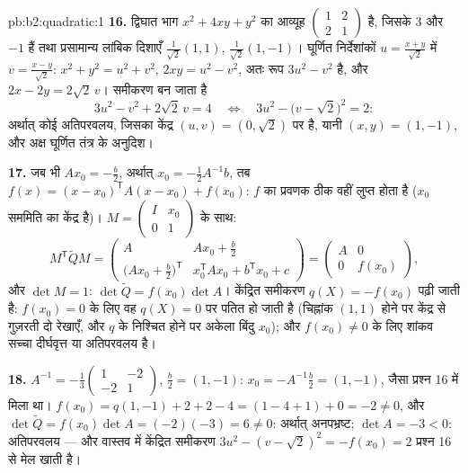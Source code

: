 \begin{solution}{pb:b2:quadratic:1}
\textbf{16.} द्विघात भाग $x^2 + 4xy + y^2$ का आव्यूह $\begin{pmatrix}1 & 2\\ 2 & 1\end{pmatrix}$ है, जिसके  $3$
और $-1$ हैं तथा प्रसामान्य लांबिक दिशाएँ $\frac{1}{\sqrt2}(1,1)$, $\frac{1}{\sqrt2}(1,-1)$। घूर्णित निर्देशांकों
$u =
\frac{x+y}{\sqrt2}$ में $v = \frac{x-y}{\sqrt2}$: $x^2 + y^2 = u^2
+ v^2$, $2xy = u^2 - v^2$, अतः रूप $3u^2 - v^2$ है, और $2x
- 2y = 2\sqrt2\,v$। समीकरण बन जाता है
\[
3u^2 - v^2 + 2\sqrt2\,v = 4
\quad\Longleftrightarrow\quad
3u^2 - \bigl(v - \sqrt2\bigr)^2 = 2 :
\]
अर्थात् कोई अतिपरवलय, जिसका केंद्र $(u, v) = (0, \sqrt2)$ पर है, यानी $(x, y) =
(1, -1)$, और अक्ष घूर्णित
तंत्र के अनुदिश।

\textbf{17.} जब भी $Ax_0 = -\frac b2$, अर्थात् $x_0 = -\frac12A^{-1}b$, तब $f(x) = (x - x_0)^{\mathsf T}A(x - x_0) + f(x_0)$: $f$ का प्रवणक ठीक वहीं लुप्त
होता है ($x_0$ सममिति का केंद्र है)। $M = \begin{pmatrix} I & x_0\\ 0 &
1\end{pmatrix}$ के साथ:
\[
M^{\mathsf T}\widetilde QM
= \begin{pmatrix}
A & Ax_0 + \frac b2\\[2pt]
\bigl(Ax_0 + \frac b2\bigr)^{\mathsf T} &
x_0^{\mathsf T}Ax_0 + b^{\mathsf T}x_0 + c
\end{pmatrix}
= \begin{pmatrix} A & 0\\ 0 & f(x_0)\end{pmatrix},
\]
और $\det M = 1$: $\det\widetilde Q = f(x_0)\det A$। केंद्रित समीकरण $q(X) = -f(x_0)$ पढ़ी जाती है: $f(x_0) = 0$ के लिए वह $q(X) = 0$ पर
पतित हो जाती है (चिह्नांक $(1,1)$ होने पर केंद्र से गुज़रती दो रेखाएँ, और
$q$ के निश्चित होने पर अकेला बिंदु $x_0$); और $f(x_0) \neq 0$ के लिए शांकव सच्चा
दीर्घवृत्त या अतिपरवलय है।

\textbf{18.} $A^{-1} = -\frac13\begin{pmatrix} 1 & -2\\ -2 &
1\end{pmatrix}$, $\frac b2 = (1, -1)$: $x_0 =
-A^{-1}\frac b2 = (1, -1)$, जैसा प्रश्न 16 में मिला था। $f(x_0) =
q(1,-1) + 2 + 2 - 4 = (1 - 4 + 1) + 0 = -2 \neq 0$, और $\det\widetilde Q = f(x_0)\det A = (-2)(-3) = 6 \neq 0$:
अर्थात् अनपभ्रष्ट; $\det A = -3 < 0$: अतिपरवलय --- और वास्तव में केंद्रित समीकरण $3u^2 - (v - \sqrt2)^2 = -f(x_0) = 2$
प्रश्न 16 से मेल खाती है।


\end{solution}
